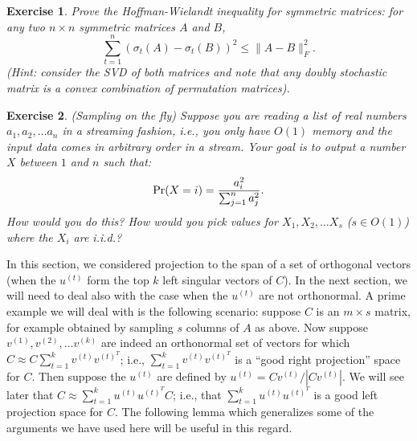 \documentclass{book}
\newtheorem{exercise}{Exercise}
\numberwithin{exercise}{chapter}
\begin{document}
\begin{exercise}\label{ex:hw}
Prove the Hoffman-Wielandt inequality for symmetric matrices: for any two $n \times n$ symmetric matrices $A$ and $B$,
\[
\sum_{t=1}^n \left(\sigma_t(A)-\sigma_t(B)\right)^2 \le \|A-B\|_F^2.
\]
(Hint: consider  the SVD of both matrices and note that any doubly stochastic matrix is a convex combination of permutation matrices).
\end{exercise}

\begin{exercise}\label{ex:on-the-fly}
(Sampling on the fly)
Suppose you are reading a list of real
numbers $a_1,a_2,\ldots a_n$ in a streaming fashion, i.e., you only have $O(1)$ memory
and the input data comes in arbitrary order in a stream.
Your goal is to output a number $X$ between $1$ and $n$ such that:
$$\hbox{Pr} (X=i) = {a_i^2\over \sum_{j=1}^n a_j^2}.$$
How would you do this? How would you pick values for
$X_1,X_2,\ldots X_s$ ($s\in O(1)$) where the $X_i$ are i.i.d.?
\end{exercise}



In this section, we considered projection to the span of a set of orthogonal vectors (when the $u^{(t)}$ form the top $k$ left singular vectors of $C$).
In the next section, we will need to deal also with the case when the $u^{(t)}$ are not orthonormal.
A prime example we will deal with is the
following scenario: suppose $C$ is an $m\times s$ matrix, for example
obtained by sampling $s$ columns of $A$ as above. Now suppose
$v^{(1)},v^{(2)},\ldots v^{(k)}$ are indeed an orthonormal set of vectors for which
$C\approx C\sum_{t=1}^kv^{(t)}v^{(t)^T}$; i.e., $\sum_{t=1}^kv^{(t)}v^{(t)^T}$ is a ``good right projection'' space for $C$. Then suppose the $u^{(t)}$ are defined by $u^{(t)}=Cv^{(t)}/|Cv^{(t)}|$. We will see later that $C\approx \sum_{t=1}^ku^{(t)}u^{(t)^T}C$; i.e., that $\sum_{t=1}^ku^{(t)}u^{(t)^T}$ is a good left projection space for $C$.
The following lemma which generalizes some of the arguments we have used here will be useful in this regard.
\end{document}
